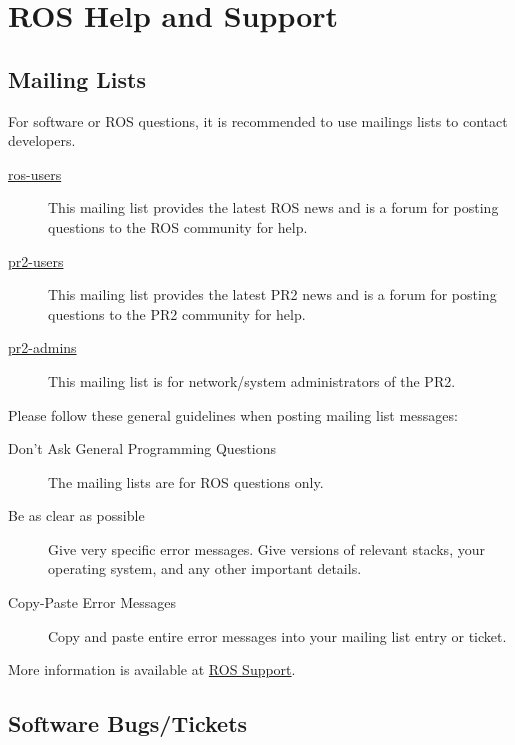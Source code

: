 \section{ROS Help and Support}

\subsection{Mailing Lists}

For software or ROS questions, it is recommended to use mailings lists to contact developers.

\begin{description}
\item[\href{https://code.ros.org/mailman/listinfo/ros-users}{ros-users}] This mailing list 
provides the latest ROS news and is a forum for posting questions to the ROS community for help. 

\item[\href{http://lists.willowgarage.com/cgi-bin/mailman/listinfo/pr2-users}{pr2-users}] This 
mailing list provides the latest PR2 news and is a forum for posting questions to the PR2 community 
for help.

\item[\href{http://lists.willowgarage.com/cgi-bin/mailman/listinfo/pr2-admins}{pr2-admins}] This 
mailing list is for network/system administrators of the PR2. 

\end{description}

Please follow these general guidelines when posting mailing list messages:
\begin{description}
\item[Don't Ask General Programming Questions] The mailing lists are for ROS questions only.
\item[Be as clear as possible] Give very specific error messages. Give versions of relevant stacks, your operating system, and any other important details.
\item[Copy-Paste Error Messages] Copy and paste entire error messages into your mailing list entry or ticket.
\end{description}

More information is available at \href{http://www.ros.org/wiki/Support}{ROS Support}.

\subsection{Software Bugs/Tickets}

